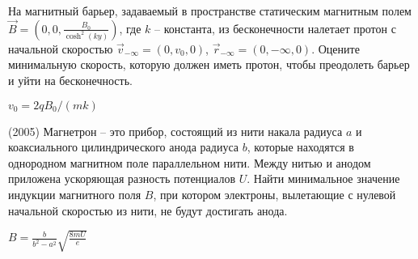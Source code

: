 \begin{ex}
На магнитный барьер, задаваемый в пространстве статическим магнитным полем $\vec{B} = \left(0, 0, \frac{B_0}{\cosh^2(ky)}\right)$, где $k$ -- константа, из бесконечности налетает протон с начальной скоростью $\vec{v}_{-\infty} = (0, v_0, 0)$, $\vec{r}_{-\infty} = (0, -\infty, 0)$. Оцените минимальную скорость, которую должен иметь протон, чтобы преодолеть барьер и уйти на бесконечность. 
\begin{ans}
$v_0 = 2qB_0/(mk)$
\end{ans}
\end{ex}

\begin{ex}
(2005)  Магнетрон -- это прибор, состоящий из нити накала радиуса $a$ и коаксиального цилиндрического анода радиуса $b$, которые находятся в однородном магнитном поле параллельном нити. Между нитью и анодом приложена ускоряющая разность потенциалов $U$. Найти минимальное значение индукции магнитного поля $B$, при котором электроны, вылетающие с нулевой начальной скоростью из нити, не будут достигать анода.
\begin{ans}
$B=\frac{b}{b^2-a^2}\sqrt{\frac{8mU}{e}}$
\end{ans}
\end{ex}
